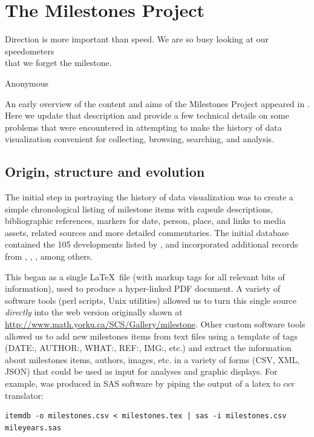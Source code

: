 \section{The Milestones Project}\label{sec:project}
\epigraph{Direction is more important than speed. We are so busy looking at our speedometers \\ that we forget the milestone.}{Anonymous} %

An early overview of the content and aims of the Milestones Project appeared in \cite{Friendly:04:gfkl}. Here we update that description and provide a few technical details on some problems that were encountered in attempting to make the history of data visualization convenient for collecting, browsing, searching, and analysis.

\subsection{Origin, structure and evolution}\label{sec:structure}
The initial step in portraying the history of data visualization was to create a simple chronological listing of milestone items with capsule descriptions, bibliographic references, markers for date, person, place, and links to media assets, related sources and more detailed commentaries. The initial database contained the 105 developments listed by \citet{BenigerRobyn:1978}, and incorporated additional records from \citet{Hankins:1999}, \citet{Tufte:1983,Tufte:1990,Tufte:1997}, \citet{Heiser:2000}, among others.

This began as a single \LaTeX\ file (with markup tags for all relevant bits of information), used to produce a hyper-linked PDF document.  A variety of software tools (perl scripts, Unix utilities) allowed us to turn this single source \emph{directly} into the web version originally shown at
\url{http://www.math.yorku.ca/SCS/Gallery/milestone}.  Other custom software tools allowed us to add new milestones items from text files using a template of tags (DATE:, AUTHOR:, WHAT:, REF:, IMG:, etc.) and extract the information about milestones items, authors, images, etc. in a variety of forms (CSV, XML, JSON) that could be used as input for analyses and graphic displays.  For example,  was produced in SAS software by piping the output of a latex to csv translator:
\begin{verbatim} 
itemdb -o milestones.csv < milestones.tex | sas -i milestones.csv mileyears.sas 
\end{verbatim}

